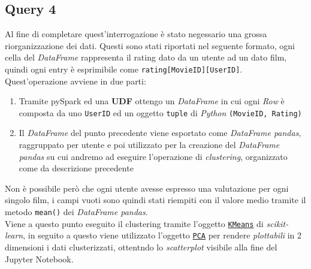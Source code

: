 \documentclass{article}
\begin{document}
    \newpage
    \subsection{Query 4}
        Al fine di completare quest'interrogazione è stato negessario una grossa riorganizzazione dei dati. Questi sono stati riportati nel seguente formato, ogni cella del \textit{DataFrame} rappresenta il rating dato da un utente ad un dato film, quindi ogni entry è esprimibile come \texttt{rating[MovieID][UserID]}. Quest'operazione avviene in due parti:
        \begin{enumerate}
            \item Tramite pySpark ed una \textbf{UDF} ottengo un \textit{DataFrame} in cui ogni \textit{Row} è composta da uno \texttt{UserID} ed un oggetto \texttt{tuple} di \textit{Python} \texttt{(MovieID, Rating)}
            \item Il \textit{DataFrame} del punto precedente viene esportato come \textit{DataFrame pandas}, raggruppato per utente e poi utilizzato per la creazione del \textit{DataFrame pandas} su cui andremo ad eseguire l'operazione di \textit{clustering}, organizzato come da descrizione precedente
        \end{enumerate}
        Non è possibile però che ogni utente avesse espresso una valutazione per ogni singolo film, i campi vuoti sono quindi stati riempiti con il valore medio tramite il metodo \texttt{mean()} dei \textit{DataFrame pandas}.\\
        Viene a questo punto eseguito il clustering tramite l'oggetto \href{https://scikit-learn.org/stable/modules/generated/sklearn.cluster.KMeans.html}{\texttt{KMeans}} di \textit{scikit-learn}, in seguito a questo viene utilizzato l'oggetto \href{https://scikit-learn.org/stable/modules/generated/sklearn.decomposition.PCA.html}{\texttt{PCA}} per rendere \textit{plottabili} in 2 dimensioni i dati clusterizzati, ottentndo lo \textit{scatterplot} visibile alla fine del Jupyter Notebook.
\end{document}
